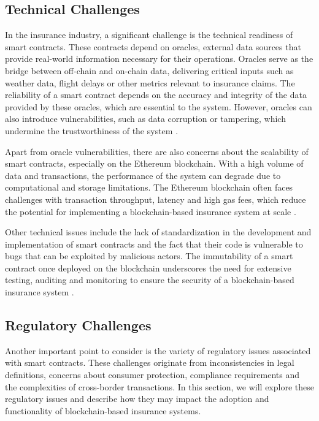 \subsection{Technical Challenges}\label{technical_challenges_chapter1}
In the insurance industry, a significant challenge is the technical readiness of smart contracts. These contracts depend on oracles, external data sources that provide real-world information necessary for their operations. Oracles serve as the bridge between off-chain and on-chain data, delivering critical inputs such as weather data, flight delays or other metrics relevant to insurance claims. The reliability of a smart contract depends on the accuracy and integrity of the data provided by these oracles, which are essential to the system. However, oracles can also introduce vulnerabilities, such as data corruption or tampering, which undermine the trustworthiness of the system \autocites{Sheldon2020Auditing}{Al-Breiki2020Trustworthy}.

Apart from oracle vulnerabilities, there are also concerns about the scalability of smart contracts, especially on the Ethereum blockchain. With a high volume of data and transactions, the performance of the system can degrade due to computational and storage limitations. The Ethereum blockchain often faces challenges with transaction throughput, latency and high gas fees, which reduce the potential for implementing a blockchain-based insurance system at scale \autocites{Khan2021Systematic}{Chauhan2018Blockchain}.

Other technical issues include the lack of standardization in the development and implementation of smart contracts and the fact that their code is vulnerable to bugs that can be exploited by malicious actors. The immutability of a smart contract once deployed on the blockchain underscores the need for extensive testing, auditing and monitoring to ensure the security of a blockchain-based insurance system \autocite{Chen2019Defining}.

\subsection{Regulatory Challenges}\label{regulatory_challenges_chapter1}
Another important point to consider is the variety of regulatory issues associated with smart contracts. These challenges originate from inconsistencies in legal definitions, concerns about consumer protection, compliance requirements and the complexities of cross-border transactions. In this section, we will explore these regulatory issues and describe how they may impact the adoption and functionality of blockchain-based insurance systems.

